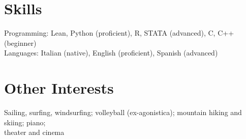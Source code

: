 \documentclass[margin,line]{res}
\begin{document}
\begin{resume}
\section{\sc Skills}
Programming: Lean, Python (proficient), R, STATA (advanced), C, C++ (beginner)\\
Languages: Italian (native), English (proficient), Spanish (advanced)\\

\vspace*{-0.6cm}
\section{\sc Other Interests}
Sailing, surfing, windsurfing; volleyball (ex-agonistica); mountain hiking and skiing; piano; \\theater and cinema

\end{resume}
\end{document}
